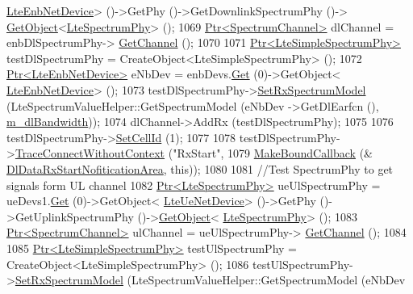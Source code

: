 \begin{DoxyCode}
      \hyperlink{classns3_1_1LteEnbNetDevice}{LteEnbNetDevice}> ()->GetPhy ()->GetDownlinkSpectrumPhy ()->
      \hyperlink{classns3_1_1Object_a13e18c00017096c8381eb651d5bd0783}{GetObject}<\hyperlink{classns3_1_1LteSpectrumPhy}{LteSpectrumPhy}> ();
1069   \hyperlink{classns3_1_1Ptr}{Ptr<SpectrumChannel>} dlChannel = enbDlSpectrumPhy->
      \hyperlink{classns3_1_1LteSpectrumPhy_a50f13e43568687ee32c5d63e5bf639c2}{GetChannel} ();
1070 
1071   \hyperlink{classns3_1_1Ptr}{Ptr<LteSimpleSpectrumPhy>} testDlSpectrumPhy = CreateObject<LteSimpleSpectrumPhy>
       ();
1072   \hyperlink{classns3_1_1Ptr}{Ptr<LteEnbNetDevice>} eNbDev = enbDevs.\hyperlink{classns3_1_1NetDeviceContainer_a677d62594b5c9d2dea155cc5045f4d0b}{Get} (0)->GetObject<
      \hyperlink{classns3_1_1LteEnbNetDevice}{LteEnbNetDevice}> ();
1073   testDlSpectrumPhy->\hyperlink{classns3_1_1LteSimpleSpectrumPhy_a1cbc14b5951a6c9360d3b180760429d9}{SetRxSpectrumModel} (LteSpectrumValueHelper::GetSpectrumModel (eNbDev
      ->GetDlEarfcn (), \hyperlink{classLteFrAreaTestCase_a645fc2cea287afbd373f6d702152cf47}{m\_dlBandwidth}));
1074   dlChannel->AddRx (testDlSpectrumPhy);
1075 
1076   testDlSpectrumPhy->\hyperlink{classns3_1_1LteSimpleSpectrumPhy_aed3e4883b1f03358a744746b08fbd5d8}{SetCellId} (1);
1077 
1078   testDlSpectrumPhy->\hyperlink{classns3_1_1ObjectBase_a1be45f6fd561e75dcac9dfa81b2b81e4}{TraceConnectWithoutContext} (\textcolor{stringliteral}{"RxStart"},
1079                                                  \hyperlink{group__makeboundcallback_ga1725d6362e6065faa0709f7c93f8d770}{MakeBoundCallback} (&
      \hyperlink{lte-test-frequency-reuse_8cc_a39fd51e5983e3a2105d2862729ad91e0}{DlDataRxStartNofiticationArea}, \textcolor{keyword}{this}));
1080 
1081   \textcolor{comment}{//Test SpectrumPhy to get signals form UL channel}
1082   \hyperlink{classns3_1_1Ptr}{Ptr<LteSpectrumPhy>} ueUlSpectrumPhy = ueDevs1.\hyperlink{classns3_1_1NetDeviceContainer_a677d62594b5c9d2dea155cc5045f4d0b}{Get} (0)->GetObject<
      \hyperlink{classns3_1_1LteUeNetDevice}{LteUeNetDevice}> ()->GetPhy ()->GetUplinkSpectrumPhy ()->\hyperlink{classns3_1_1Object_a13e18c00017096c8381eb651d5bd0783}{GetObject}<
      \hyperlink{classns3_1_1LteSpectrumPhy}{LteSpectrumPhy}> ();
1083   \hyperlink{classns3_1_1Ptr}{Ptr<SpectrumChannel>} ulChannel = ueUlSpectrumPhy->
      \hyperlink{classns3_1_1LteSpectrumPhy_a50f13e43568687ee32c5d63e5bf639c2}{GetChannel} ();
1084 
1085   \hyperlink{classns3_1_1Ptr}{Ptr<LteSimpleSpectrumPhy>} testUlSpectrumPhy = CreateObject<LteSimpleSpectrumPhy>
       ();
1086   testUlSpectrumPhy->\hyperlink{classns3_1_1LteSimpleSpectrumPhy_a1cbc14b5951a6c9360d3b180760429d9}{SetRxSpectrumModel} (LteSpectrumValueHelper::GetSpectrumModel (eNbDev

\end{DoxyCode}
